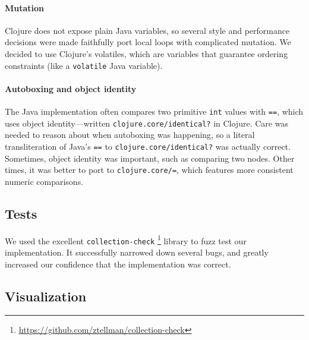 \documentclass[preprint]{sigplanconf}
\begin{document}
\paragraph{Mutation}
Clojure does not expose plain Java variables, so several
style and performance decisions were made faithfully port
local loops with complicated mutation.
We decided to use Clojure's volatiles, which are variables
that guarantee ordering constraints (like a \texttt{volatile}
Java variable).

%
\paragraph{Autoboxing and object identity}
The Java implementation often compares two primitive
\texttt{int} values with \texttt{==}, which uses
object identity---written \texttt{clojure.core/identical?} in
Clojure.
Care was needed to reason about when
autoboxing was happening, so a literal
transliteration of Java's \texttt{==} to \texttt{clojure.core/identical?}
was actually correct. Sometimes, object identity
was important, such as comparing two nodes. Other times,
it was better to port to \texttt{clojure.core/=},
which features more consistent numeric comparisons.


\subsection{Tests}

We used the excellent \texttt{collection-check}
\footnote{\url{https://github.com/ztellman/collection-check}}
library to fuzz test our implementation.
It successfully narrowed down several bugs,
and greatly increased our confidence that the
implementation was correct.

\subsection{Visualization}
\end{document}
